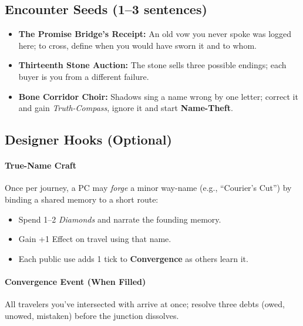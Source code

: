 \subsection*{Encounter Seeds (1–3 sentences)}

\begin{itemize}
\item \textbf{The Promise Bridge’s Receipt:} An old vow you never spoke was logged here; to cross, define when you would have sworn it and to whom.
\item \textbf{Thirteenth Stone Auction:} The stone sells three possible endings; each buyer is you from a different failure.
\item \textbf{Bone Corridor Choir:} Shadows sing a name wrong by one letter; correct it and gain \emph{Truth-Compass}, ignore it and start \textbf{Name-Theft}.
\end{itemize}
\subsection*{Designer Hooks (Optional)}

\paragraph{True-Name Craft}
Once per journey, a PC may \emph{forge} a minor way-name (e.g., “Courier’s Cut”) by binding a shared memory to a short route:
\begin{itemize}
\item Spend 1–2 \emph{Diamonds} and narrate the founding memory.
\item Gain +1 Effect on travel using that name. 
\item Each public use adds 1 tick to \textbf{Convergence} as others learn it.
\end{itemize}

\paragraph{Convergence Event (When Filled)}
All travelers you’ve intersected with arrive at once; resolve three debts (owed, unowed, mistaken) before the junction dissolves.